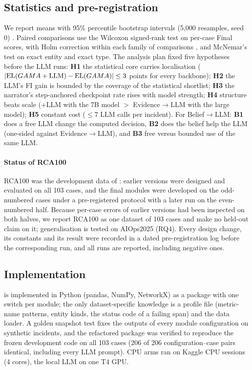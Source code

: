 \subsection{Statistics and pre-registration}
We report means with 95\% percentile bootstrap intervals (5,000 resamples, seed 0) \citep{efron1993bootstrap}. Paired comparisons
use the Wilcoxon signed-rank test \citep{wilcoxon1945individual} on per-case Final scores, with Holm correction within each family of
comparisons \citep{holm1979simple}, and McNemar's test \citep{mcnemar1947note} on exact entity and exact type. The analysis plan
fixed five hypotheses before the LLM runs: \textbf{H1} the statistical core carries localisation
($|\text{EL}(GAMA{}+\text{LLM})-\text{EL}(GAMA{})|\leq3$ points for every backbone); \textbf{H2} the LLM's FI gain is bounded by the
coverage of the statistical shortlist; \textbf{H3} the narrator's step-anchored checkpoint rate rises with model strength;
\textbf{H4} structure beats scale (\core{}+LLM with the 7B model $>$ Evidence$\rightarrow$LLM with the large model); \textbf{H5}
constant cost ($\leq 7$ LLM calls per incident). For Belief$\rightarrow$LLM: \textbf{B1} does a free LLM change the computed decision,
\textbf{B2} does the belief help the LLM (one-sided against Evidence$\rightarrow$LLM), and \textbf{B3} free versus bounded use of the same
LLM.

\paragraph{Status of RCA100}
RCA100 was the development data of \gama{}: earlier versions were designed and evaluated on all 103 cases, and the final modules
were developed on the odd-numbered cases under a pre-registered protocol with a later run on the even-numbered half. Because
per-case errors of earlier versions had been inspected on both halves, we report RCA100 as one dataset of 103 cases and make no
held-out claim on it; generalisation is tested on AIOps2025 (RQ4). Every design change, its constants and its result were recorded
in a dated pre-registration log before the corresponding run, and all runs are reported, including negative ones.

\subsection{Implementation}
\gama{} is implemented in Python (pandas, NumPy, NetworkX) as a package with one switch per module; the only dataset-specific
knowledge is a profile file (metric-name patterns, entity kinds, the status code of a failing span) and the data loader. A golden
snapshot test fixes the outputs of every module configuration on synthetic incidents, and the refactored package was verified to
reproduce the frozen development code on all 103 cases (206 of 206 configuration--case pairs identical, including every LLM prompt).
CPU arms ran on Kaggle CPU sessions (4 cores), the local LLM on one T4 GPU.

